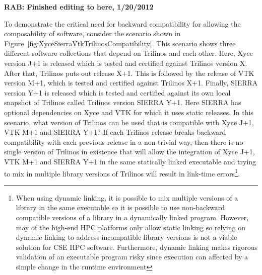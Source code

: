 \documentclass[11pt]{SANDreport}
\begin{document}
{}\textbf{RAB: Finished editing to here, 1/20/2012}

To demonstrate the critical need for backward compatibility for
allowing the composability of software, consider the scenario shown in
Figure~\ref{fig:XyceSierraVtkTrilinosCompatibility}.  This scenario
shows three different software collections that depend on Trilinos and
each other.  Here, Xyce version J+1 is released which is tested and
certified against Trilinos version X.  After that, Trilinos puts out
release X+1.  This is followed by the release of VTK version M+1,
which is tested and certified against Trilinos X+1.  Finally, SIERRA
version Y+1 is released which is tested and certified against its own
local snapshot of Trilinos called Trilinos version SIERRA Y+1.  Here
SIERRA has optional dependencies on Xyce and VTK for which it uses
static releases.  In this scenario, what version of Trilinos can be
used that is compatible with Xyce J+1, VTK M+1 and SIERRA Y+1?  If
each Trilinos release breaks backward compatibility with each previous
release in a non-trivial way, then there is no single version of
Trilinos in existence that will allow the integration of Xyce J+1, VTK
M+1 and SIERRA Y+1 in the same statically linked executable and trying
to mix in multiple library versions of Trilinos will result in
link-time errors\footnote{When using dynamic linking, it is possible
to mix multiple versions of a library in the same executable so it is
possible to use non-backward compatible versions of a library in a
dynamically linked program.  However, may of the high-end HPC
platforms only allow static linking so relying on dynamic linking to
address incompatible library versions is not a viable solution for CSE
HPC software.  Furthermore, dynamic linking makes rigorous validation
of an executable program risky since execution can affected by a
simple change in the runtime environment}.
\end{document}
